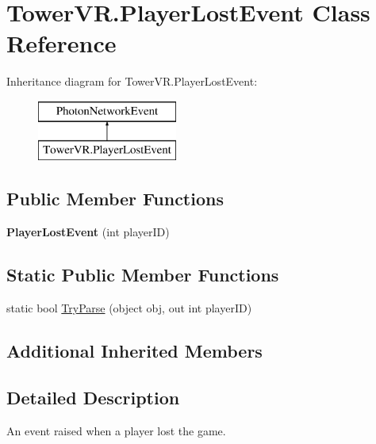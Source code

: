 \hypertarget{class_tower_v_r_1_1_player_lost_event}{}\section{Tower\+V\+R.\+Player\+Lost\+Event Class Reference}
\label{class_tower_v_r_1_1_player_lost_event}
Inheritance diagram for Tower\+V\+R.\+Player\+Lost\+Event\+:\begin{figure}[H]
\begin{center}
\leavevmode
\includegraphics[height=2.000000cm]{class_tower_v_r_1_1_player_lost_event}
\end{center}
\end{figure}
\subsection*{Public Member Functions}
\begin{DoxyCompactItemize}
\item 
{\bfseries Player\+Lost\+Event} (int player\+ID)\hypertarget{class_tower_v_r_1_1_player_lost_event_a4ecf91efaab9b6d6c50dd8946bd3b4c8}{}\label{class_tower_v_r_1_1_player_lost_event_a4ecf91efaab9b6d6c50dd8946bd3b4c8}

\end{DoxyCompactItemize}
\subsection*{Static Public Member Functions}
\begin{DoxyCompactItemize}
\item 
static bool \hyperlink{class_tower_v_r_1_1_player_lost_event_a1a5a7b6b2e4b15c97ae2b0da6be59afd}{Try\+Parse} (object obj, out int player\+ID)
\end{DoxyCompactItemize}
\subsection*{Additional Inherited Members}


\subsection{Detailed Description}
An event raised when a player lost the game. 

